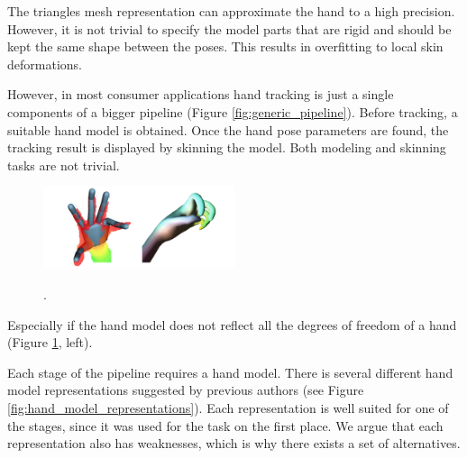 
The triangles mesh representation can approximate the hand to a high precision. However, it is not trivial to specify the model parts that are rigid and should be kept the same shape between the poses. This results in overfitting to local skin deformations. 

However, in most consumer applications hand tracking is just a single components of a bigger pipeline (Figure \ref{fig:generic_pipeline}). Before tracking, a suitable hand model is obtained. Once the hand pose parameters are found, the tracking result is displayed by skinning the model. Both modeling and skinning tasks are not trivial.

\begin{figure}[h!] 
\centering
\hspace{-2em}
\includegraphics[width=0.5\textwidth]{fig/coarse_hand_model_and_lbs}
\caption{}.
\label{fig:coarse_hand_model_and_lbs}
\end{figure}

Especially if the hand model does not reflect all the degrees of freedom of a hand (Figure \ref{fig:coarse_hand_model_and_lbs}, left).

Each stage of the pipeline requires a hand model. There is several different hand model representations suggested by previous authors (see Figure \ref{fig:hand_model_representations}). Each representation is well suited for one of the stages, since it was used for the task on the first place. We argue that each representation also has weaknesses, which is why there exists a set of alternatives.

